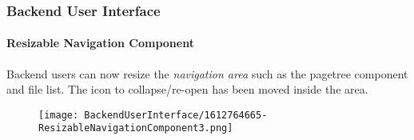 %

\begin{frame}[fragile]
	\frametitle{Backend User Interface}
	\framesubtitle{Resizable Navigation Component}

	Backend users can now resize the \textit{navigation area} such as the pagetree
	component and file list. The icon to collapse/re-open has been moved inside
	the area.

	\begin{figure}
		\texttt{[image: BackendUserInterface/1612764665-ResizableNavigationComponent3.png]}
	\end{figure}

\end{frame}

